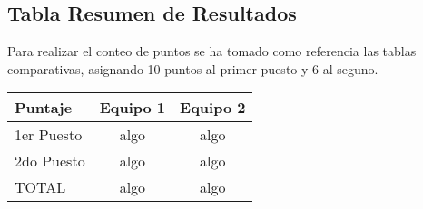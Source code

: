 \subsection{Tabla Resumen de Resultados}
Para realizar el conteo de puntos se ha tomado como referencia las tablas comparativas, asignando 10 puntos al primer puesto y 6 al seguno.

\begin{center}
\begin{tabular}{|lcc|} \hline
\footnotesize\textbf{Puntaje} & \footnotesize\textbf{Equipo 1} & \footnotesize\textbf{Equipo 2} \\\hline
1er Puesto & algo & algo \\\hline
2do Puesto & algo & algo \\\hline
TOTAL & algo & algo \\\hline
\end{tabular}
\end{center}
